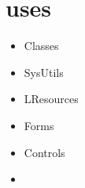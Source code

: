 \documentclass{report}
\begin{document}
\section{uses}
\begin{itemize}
\item \begin{ttfamily}Classes\end{ttfamily}\item \begin{ttfamily}SysUtils\end{ttfamily}\item \begin{ttfamily}LResources\end{ttfamily}\item \begin{ttfamily}Forms\end{ttfamily}\item \begin{ttfamily}Controls\end{ttfamily}\item \
\end{itemize}
\end{document}
